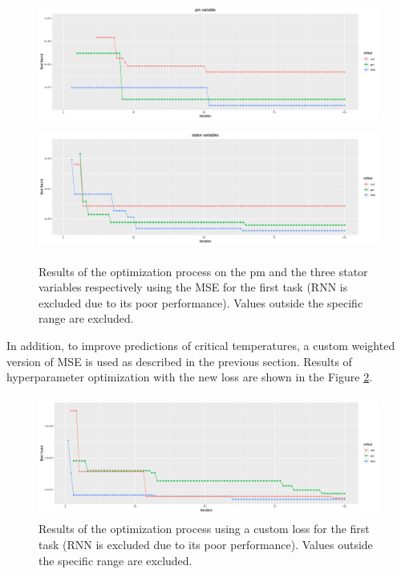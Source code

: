 \begin{figure}[!h]
    \centering
    \includegraphics[width=\linewidth, height=4cm]{imgs/comparison_MSE.png}
    \includegraphics[width=\linewidth, height=4cm]{imgs/comparison_MSE_stator.png}
    \caption{Results of the optimization process on the pm and the three stator variables respectively using the MSE for the first task (RNN is excluded due to its poor performance). Values outside the specific range are excluded.}
    \label{fig:automl_mse}
\end{figure}
  
In addition, to improve predictions of critical temperatures, a custom weighted version of MSE is used as described in the previous section. Results of hyperparameter optimization with the new loss are shown in the Figure \ref{fig:automl_custom}.\\
\begin{figure}[!h]
    \centering
    \includegraphics[width=\linewidth, height=4cm]{imgs/comparison_MSE_new_loss.png}
    \caption{Results of the optimization process using a custom loss for the first task (RNN is excluded due to its poor performance). Values outside the specific range are excluded.}
    \label{fig:automl_custom}
\end{figure}

